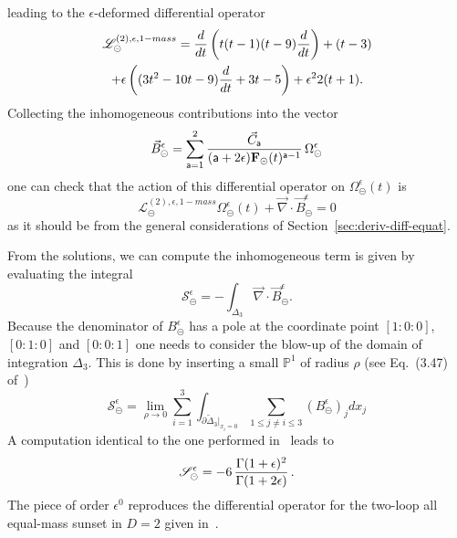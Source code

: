 \documentclass[a4paper,12pt]{article}
\numberwithin{equation}{section}
\numberwithin{figure}{section}
\def\su{\circleddash}
\begin{document}
leading to the $\epsilon$-deformed differential operator
\begin{multline}
  \label{e:PF2sunset1massepsilon}
     \mathscr{L}^{(2),\epsilon,1-mass}_\su ={d\over dt}\left( t(t-1)(t-9)
       {d\over dt}\right)+(t-3)\cr+\epsilon\left((3t^2-10t-9) {d\over
         dt}+3t-5\right)
     +\epsilon^2 2(t+1).
\end{multline}
%
Collecting the inhomogeneous contributions into the vector
\begin{equation}
  \vec B_\su^\epsilon=\sum_{\mathsf{a}=1}^2 {\vec C_{\mathsf{a}}\over
    (\mathsf{a}+2\epsilon)\textbf{F}_\su(t)^{\mathsf{a}-1}}\, \Omega_\su^\epsilon
\end{equation}
one can check that the action of this differential operator on
$\Omega_{\su}^\epsilon(t)$ is
\begin{equation}
      \mathscr{L}^{(2),\epsilon,1-mass}_\su
      \Omega_{\su}^\epsilon(t)+\vec\nabla \cdot\vec B_\su^\epsilon=0
    \end{equation}
as it should be from the general considerations of Section~\ref{sec:deriv-diff-equat}.


\medskip
From the solutions, we can compute the  inhomogeneous term is given by evaluating the integral 
\begin{equation}
  \mathscr{S}_\su^\epsilon
  =-\int_{\Delta_3} \vec\nabla\cdot\vec B^\epsilon_\su.
\end{equation}
%
Because the denominator of $ B^\epsilon_\su$ has a pole at the coordinate
point $[1:0:0]$, $[0:1:0]$ and $[0:0:1]$ one needs to consider the
blow-up  of the domain of integration $\Delta_3$. This is done by inserting a small
$\mathbb P^1$ of radius $\rho$ (see Eq.~(3.47) of~\cite{Bloch:2016izu})
\begin{equation}
    \mathscr{S}_\su^\epsilon=\lim_{\rho\to0} \sum_{i=1}^3
    \int_{\partial\tilde\Delta_3|_{x_i=0}} \sum_{1\leq j\neq i\leq 3}
    (B^\epsilon_\su)_j dx_j
\end{equation}
A computation identical to the one performed in~\cite{Bloch:2016izu} leads to
\begin{equation}
 \mathscr{S}_\su^\epsilon=  -6 \, {\Gamma(1+\epsilon)^2\over \Gamma(1+2\epsilon)} \, . 
\end{equation}
The piece of order $\epsilon^0$ reproduces the differential operator
for the two-loop all equal-mass sunset in $D=2$ given
in~\cite{Bloch:2013tra,Bloch:2013tra,Vanhove:2014wqa,Bonisch:2020qmm,Pogel:2022vat}.

\end{document}
